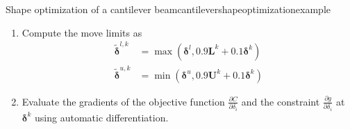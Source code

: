 \begin{example}{Shape optimization of a cantilever beam}{cantilevershapeoptimizationexample}
\begin{enumerate}
        and the upper asymptotes according to 
        \begin{equation}
            U^k_i = 
            \begin{cases}
                \delta^k_i - s  (U^{k-1}_i-\delta^{k-1}_i) & (\delta_i^k-\delta_i^{k-1})(\delta_i^{k-1}-\delta_i^{k-2}) < 0\\
                \delta^k_i - \frac{1}{\sqrt{s}}  (U^{k-1}_i-\delta^{k-1}_i) & \text{else}
            \end{cases}
        \end{equation}
        \item Compute the move limits as 
        \begin{align}
            \tilde{\pmb{\delta}}^{l,k} &= \max(\pmb{\delta}^l,  0.9 \mathbf{L}^k + 0.1 \pmb{\delta}^k) \\
            \tilde{\pmb{\delta}}^{u,k} &= \min(\pmb{\delta}^u,  0.9 \mathbf{U}^k + 0.1 \pmb{\delta}^k)
        \end{align}

        \item Evaluate the gradients of the objective function $\frac{\partial C}{\partial \delta_i}$ and the constraint $\frac{\partial g}{\partial \delta_i}$ at $\pmb{\delta}^k$ using automatic differentiation. 


\end{enumerate}
\end{example}
